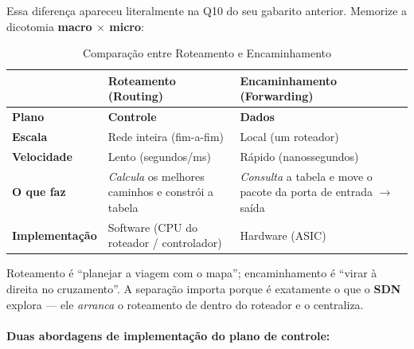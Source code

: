 \documentclass[11pt,a4paper]{article}
\begin{document}
Essa diferença apareceu literalmente na Q10 do seu gabarito anterior. Memorize a dicotomia \textbf{macro $\times$ micro}:

\begin{table}[h!]
\centering
\caption{Comparação entre Roteamento e Encaminhamento}
\label{tab:roteamento_encaminhamento}
\begin{tabularx}{\textwidth}{lXX}
\toprule
 & \textbf{Roteamento (Routing)} & \textbf{Encaminhamento (Forwarding)} \\
\midrule
\textbf{Plano} & \textbf{Controle} & \textbf{Dados} \\
\textbf{Escala} & Rede inteira (fim-a-fim) & Local (um roteador) \\
\textbf{Velocidade} & Lento (segundos/ms) & Rápido (nanossegundos) \\
\textbf{O que faz} & \emph{Calcula} os melhores caminhos e constrói a tabela & \emph{Consulta} a tabela e move o pacote da porta de entrada $\to$ saída \\
\textbf{Implementação} & Software (CPU do roteador / controlador) & Hardware (ASIC) \\
\bottomrule
\end{tabularx}
\end{table}

\begin{reflexao}
Roteamento é ``planejar a viagem com o mapa''; encaminhamento é ``virar à direita no cruzamento''. A separação importa porque é exatamente o que o \textbf{SDN} explora --- ele \textit{arranca} o roteamento de dentro do roteador e o centraliza.
\end{reflexao}

\paragraph{Duas abordagens de implementação do plano de controle:}
\end{document}
